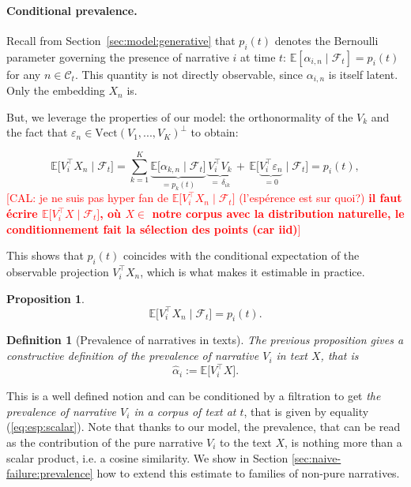 \documentclass[
  journal=medium,
  manuscript=article-type,
  year=2025,
  volume=1,
]{cup-journal}
\newtheorem{proposition}{Proposition}
\newtheorem{definition}{Definition}
\begin{document}
\paragraph{Conditional prevalence.}
Recall from Section~\ref{sec:model:generative} that $p_i(t)$ denotes the
Bernoulli parameter governing the presence of narrative $i$ at time $t$:
$\mathbb E[\alpha_{i,n} \mid \mathcal F_t] = p_i(t)$ for any $n \in \mathcal
C_t$. This quantity is not directly observable, since $\alpha_{i,n}$ is
itself latent. Only the embedding $X_n$ is. 

But, we leverage the properties of our model: the orthonormality of the $V_k$ and the fact that $\varepsilon_n \in \text{Vect}(V_1, ..., V_K)^{\perp}$ to obtain:

\begin{equation}
    \mathbb E\bigl[V_i^\top X_n \mid \mathcal F_t\bigr]
    = \sum_{k=1}^K \underbrace{\mathbb{E}\bigl[\alpha_{k,n} \mid \mathcal F_t\bigr]}_{=p_k(t)}\, \underbrace{V_i^\top V_k}_{=\,\delta_{ik}} \,
      + \, \mathbb E\bigl[\underbrace{V_i^\top \varepsilon_n}_{=0} \mid \mathcal F_t\bigr]
    = p_i(t),
\end{equation}
\textcolor{red}{[CAL: je ne suis pas hyper fan de $\mathbb E\bigl[V_i^\top X_n \mid \mathcal F_t\bigr]$ (l'espérence est sur quoi?) \textbf{il faut  écrire $\mathbb E\bigl[V_i^\top X \mid \mathcal F_t\bigr]$, où $X\in$ notre corpus avec la distribution naturelle, le conditionnement fait la sélection des points (car iid)}]}


This shows that $p_i(t)$ coincides with the conditional expectation of the observable
projection $V_i^\top X_n$, which is what makes it estimable in practice.



\begin{proposition}
\label{prop:prevalence-projection}
\begin{equation}
    \label{eq:esp:scalar}
    \mathbb E\bigl[V_i^\top X_n \mid \mathcal F_t\bigr] = p_i(t).
\end{equation}
\end{proposition}

{\color{ForestGreen}
\begin{definition}[Prevalence of narratives in texts]
\label{def:prevalence}
The previous proposition gives a constructive definition of \emph{the prevalence of narrative $V_i$ in text $X$}, that is 
\begin{equation}
    \label{eq:def:prevalence}
    \hat\alpha_i:=\mathbb E\bigl[V_i^\top X\bigr].
\end{equation}
\end{definition}
This is a well defined notion and can be conditioned by a filtration to get \emph{the prevalence of narrative $V_i$ in a corpus of text at $t$}, that is given by equality (\ref{eq:esp:scalar}).
Note that thanks to our model, the prevalence, that can be read as the contribution of the pure narrative $V_i$ to the text $X$, is nothing more than a scalar product, i.e. a cosine similarity. We show in Section \ref{sec:naive-failure:prevalence} how to extend this estimate to families of non-pure narratives.
}
\end{document}
